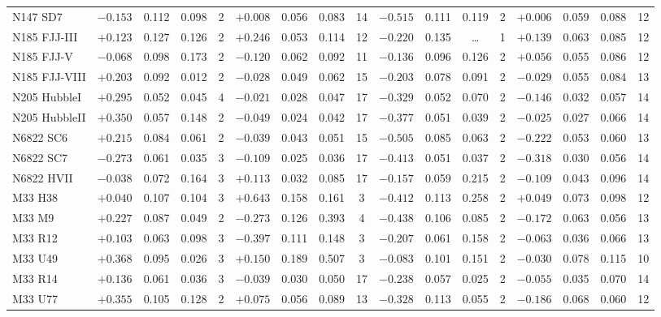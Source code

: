 \documentclass{aa}
\begin{document}
\begin{appendix}
\begin{table*}
\begin{adjustbox}{width=1\textwidth}
{\begin{tabular}{l cccccccccccccccc}
N147 SD7      & $-0.153$ & 0.112 & 0.098 & 2 & $+0.008$ & 0.056 & 0.083 & 14 & $-0.515$ & 0.111 & 0.119 & 2 & $+0.006$ & 0.059 & 0.088 & 12 \\
N185 FJJ-III  & $+0.123$ & 0.127 & 0.126 & 2 & $+0.246$ & 0.053 & 0.114 & 12 & $-0.220$ & 0.135 & \ldots & 1 & $+0.139$ & 0.063 & 0.085 & 12 \\
N185 FJJ-V    & $-0.068$ & 0.098 & 0.173 & 2 & $-0.120$ & 0.062 & 0.092 & 11 & $-0.136$ & 0.096 & 0.126 & 2 & $+0.056$ & 0.055 & 0.086 & 12 \\
N185 FJJ-VIII & $+0.203$ & 0.092 & 0.012 & 2 & $-0.028$ & 0.049 & 0.062 & 15 & $-0.203$ & 0.078 & 0.091 & 2 & $-0.029$ & 0.055 & 0.084 & 13 \\
N205 HubbleI  & $+0.295$ & 0.052 & 0.045 & 4 & $-0.021$ & 0.028 & 0.047 & 17 & $-0.329$ & 0.052 & 0.070 & 2 & $-0.146$ & 0.032 & 0.057 & 14 \\
N205 HubbleII & $+0.350$ & 0.057 & 0.148 & 2 & $-0.049$ & 0.024 & 0.042 & 17 & $-0.377$ & 0.051 & 0.039 & 2 & $-0.025$ & 0.027 & 0.066 & 14 \\
N6822 SC6     & $+0.215$ & 0.084 & 0.061 & 2 & $-0.039$ & 0.043 & 0.051 & 15 & $-0.505$ & 0.085 & 0.063 & 2 & $-0.222$ & 0.053 & 0.060 & 13 \\
N6822 SC7     & $-0.273$ & 0.061 & 0.035 & 3 & $-0.109$ & 0.025 & 0.036 & 17 & $-0.413$ & 0.051 & 0.037 & 2 & $-0.318$ & 0.030 & 0.056 & 14 \\
N6822 HVII    & $-0.038$ & 0.072 & 0.164 & 3 & $+0.113$ & 0.032 & 0.085 & 17 & $-0.157$ & 0.059 & 0.215 & 2 & $-0.109$ & 0.043 & 0.096 & 14 \\
M33 H38       & $+0.040$ & 0.107 & 0.104 & 3 & $+0.643$ & 0.158 & 0.161 & 3 & $-0.412$ & 0.113 & 0.258 & 2 & $+0.049$ & 0.073 & 0.098 & 12 \\
M33 M9        & $+0.227$ & 0.087 & 0.049 & 2 & $-0.273$ & 0.126 & 0.393 & 4 & $-0.438$ & 0.106 & 0.085 & 2 & $-0.172$ & 0.063 & 0.056 & 13 \\
M33 R12       & $+0.103$ & 0.063 & 0.098 & 3 & $-0.397$ & 0.111 & 0.148 & 3 & $-0.207$ & 0.061 & 0.158 & 2 & $-0.063$ & 0.036 & 0.066 & 13 \\
M33 U49       & $+0.368$ & 0.095 & 0.026 & 3 & $+0.150$ & 0.189 & 0.507 & 3 & $-0.083$ & 0.101 & 0.151 & 2 & $-0.030$ & 0.078 & 0.115 & 10 \\
M33 R14       & $+0.136$ & 0.061 & 0.036 & 3 & $-0.039$ & 0.030 & 0.050 & 17 & $-0.238$ & 0.057 & 0.025 & 2 & $-0.055$ & 0.035 & 0.070 & 14 \\
M33 U77       & $+0.355$ & 0.105 & 0.128 & 2 & $+0.075$ & 0.056 & 0.089 & 13 & $-0.328$ & 0.113 & 0.055 & 2 & $-0.186$ & 0.068 & 0.060 & 12 \\

\end{tabular}}
\end{adjustbox}
\end{table*}
\end{appendix}
\end{document}
